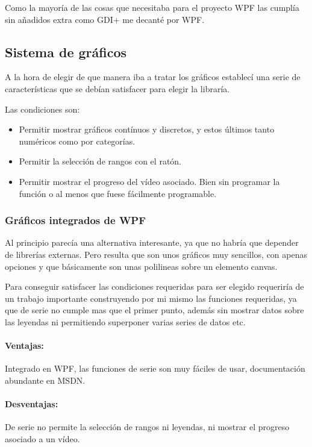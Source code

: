 Como la mayor\'{i}a de las cosas que necesitaba para el proyecto WPF las cumpl\'{i}a sin a\~{n}adidos extra como GDI+ me decant\'{e} por
WPF.

\subsection{Sistema de gr\'{a}ficos}
A la hora de elegir de que manera iba a tratar los gr\'{a}ficos establec\'{i} una serie de caracter\'{i}sticas
que se deb\'{i}an satisfacer para elegir la librar\'{i}a.

Las condiciones son:
\begin{itemize}
    \item Permitir mostrar gr\'{a}ficos cont\'{i}nuos y discretos, y estos \'{u}ltimos tanto num\'{e}ricos como por categor\'{i}as.
    \item Permitir la selecci\'{o}n de rangos con el rat\'{o}n.
    \item Permitir mostrar el progreso del v\'{i}deo asociado. Bien sin programar la funci\'{o}n o al menos que fuese f\'{a}cilmente programable.
\end{itemize}

\subsubsection{Gr\'{a}ficos integrados de WPF}
Al principio parec\'{i}a una alternativa interesante, ya que no habr\'{i}a que depender de librer\'{i}as externas. Pero resulta
que son unos gr\'{a}ficos muy sencillos, con apenas opciones y que b\'{a}sicamente son unas polilineas sobre un elemento canvas.

Para conseguir satisfacer las condiciones requeridas para ser elegido requerir\'{i}a de un trabajo importante construyendo por mi mismo
las funciones requeridas, ya que de serie no cumple mas que el primer punto, adem\'{a}s sin mostrar datos sobre las leyendas ni permitiendo superponer
varias series de datos etc.

\paragraph{Ventajas:} Integrado en WPF, las funciones de serie son muy f\'{a}ciles de usar, documentaci\'{o}n abundante en MSDN.
\paragraph{Desventajas:} De serie no permite la selecci\'{o}n de rangos ni leyendas, ni mostrar el progreso asociado a un v\'{i}deo.
